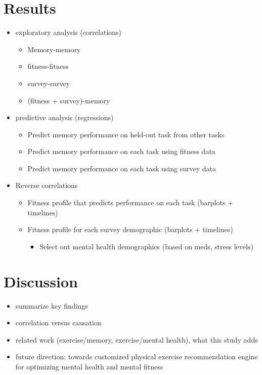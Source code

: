 \documentclass[10pt]{article}
\begin{document}
\section*{Results}
\begin{itemize}
  \item exploratory analysis (correlations)
    \begin{itemize}
    \item Memory-memory
    \item fitness-fitness
    \item survey-survey
    \item (fitness + survey)-memory
    \end{itemize}
  \item predictive analysis (regressions)
    \begin{itemize}
    \item Predict memory performance on held-out task from other tasks
    \item Predict memory performance on each task using fitness data
      \item Predict memory performance on each task using survey data
      \end{itemize}
    \item Reverse correlations
      \begin{itemize}
      \item Fitness profile that predicts performance on each task (barplots + timelines)
      \item Fitness profile for each survey demographic (barplots + timelines)
        \begin{itemize}
          \item Select out mental health demographics (based on meds, stress levels)
          \end{itemize}
        \end{itemize}
  \end{itemize}

  \section*{Discussion}
  \begin{itemize}
  \item summarize key findings
  \item correlation versus causation
  \item related work (exercise/memory, exercise/mental health), what this study adds
    \item future direction: towards customized physical exercise recommendation engine for optimizing mental health and mental fitness
    \end{itemize}
\end{document}
